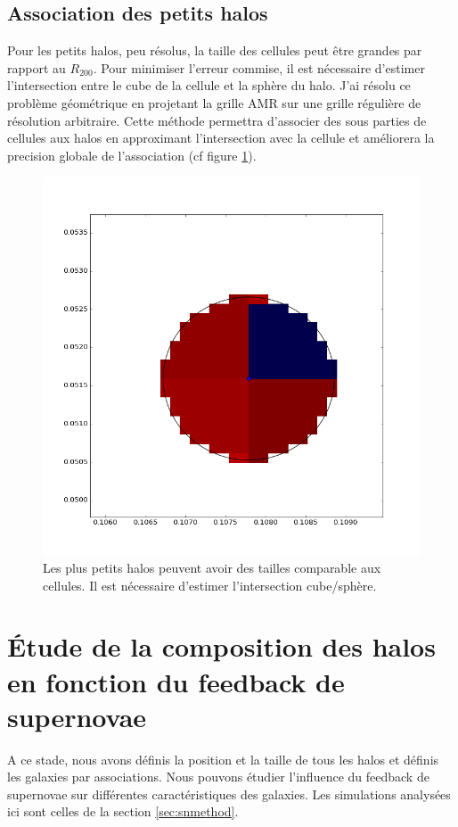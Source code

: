 \subsection{Association des petits halos}

Pour les petits halos, peu résolus, la taille des cellules peut être grandes par rapport au $R_{200}$.
Pour minimiser l'erreur commise, il est nécessaire d’estimer l'intersection entre le cube de la cellule et la sphère du halo.
J'ai résolu ce problème géométrique en projetant la grille \ac{AMR} sur une grille régulière de résolution arbitraire.
Cette méthode permettra d'associer des sous parties de cellules aux halos en approximant l'intersection avec la cellule et améliorera la precision globale de l'association (cf figure \ref{fig:intersec}).

\begin{figure}
	\centering
	\includegraphics[width=.45\linewidth]{img/03/intersec.png}
    \caption[Projection des petits halo]{Les plus petits halos peuvent avoir des tailles comparable aux cellules.
    Il est nécessaire d’estimer l'intersection cube/sphère.
 	\label{fig:intersec}}
\end{figure}

\clearpage
\section{Étude de la composition des halos en fonction du feedback de supernovae}

A ce stade, nous avons définis la position et la taille de tous les halos et définis les galaxies par associations.
Nous pouvons étudier l'influence du feedback de supernovae sur différentes caractéristiques des galaxies.
Les simulations analysées ici sont celles de la section \ref{sec:snmethod}.

